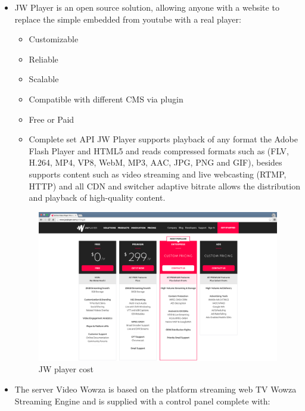 \begin{itemize}
\item JW Player is an open source solution, allowing anyone with a website to replace the simple embedded from youtube with a real player:

\begin{itemize}
\item Customizable
\item Reliable
\item Scalable
\item Compatible with different CMS via plugin
\item Free or Paid
\item Complete set API
JW Player supports playback of any format the Adobe Flash Player and HTML5 and reads compressed formats such as (FLV, H.264, MP4, VP8, WebM, MP3, AAC, JPG, PNG and GIF), besides supports content such as video streaming and live webcasting (RTMP, HTTP) and all CDN and switcher adaptive bitrate allows the distribution and playback of high-quality content.
\end{itemize}


\begin{figure}[htb]
 \centering
 \includegraphics[width=1.0\linewidth]{images/chapter3/jwtPLayer.png}\hfill
 \caption[JW player cost]{JW player cost}
 \label{fig:fourV}
\end{figure}
\item The server Video Wowza is based on the platform streaming web TV Wowza Streaming Engine and is supplied with a control panel complete with:
\begin{itemize}


\end{itemize}
\end{itemize}
